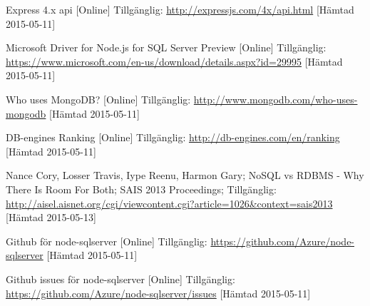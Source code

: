 \begin{thebibliography}{9}

Express 4.x api [Online] Tillgänglig: 
\url{http://expressjs.com/4x/api.html} [Hämtad 2015-05-11]

Microsoft Driver for Node.js for SQL Server Preview [Online] Tillgänglig: 
\url{https://www.microsoft.com/en-us/download/details.aspx?id=29995} [Hämtad 2015-05-11]

Who uses MongoDB? [Online] Tillgänglig: 
\url{http://www.mongodb.com/who-uses-mongodb} [Hämtad 2015-05-11]

DB-engines Ranking [Online] Tillgänglig: 
\url{http://db-engines.com/en/ranking} [Hämtad 2015-05-11]

 Nance Cory, Losser Travis, Iype Reenu, Harmon Gary; NoSQL vs RDBMS - Why There Is Room For Both; SAIS 2013 Proceedings; Tillgänglig: 
\url{http://aisel.aisnet.org/cgi/viewcontent.cgi?article=1026&context=sais2013} [Hämtad 2015-05-13]

Github för node-sqlserver [Online] Tillgänglig:  
\url{https://github.com/Azure/node-sqlserver} [Hämtad 2015-05-11]

Github issues för node-sqlserver [Online] Tillgänglig: 
\url{https://github.com/Azure/node-sqlserver/issues} [Hämtad 2015-05-11]

\end{thebibliography}
